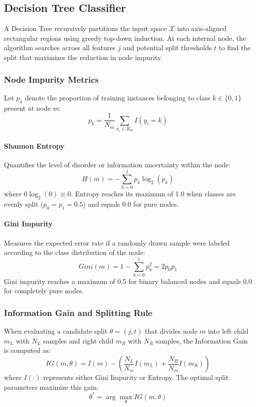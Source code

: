 \documentclass[12pt,a4paper]{article}
\begin{document}
\subsection{Decision Tree Classifier}

A Decision Tree recursively partitions the input space $\mathcal{X}$ into axis-aligned rectangular regions using greedy top-down induction. At each internal node, the algorithm searches across all features $j$ and potential split thresholds $t$ to find the split that maximizes the reduction in node impurity.

\subsubsection*{Node Impurity Metrics}

Let $p_k$ denote the proportion of training instances belonging to class $k \in \{0, 1\}$ present at node $m$:
\begin{equation}
p_k = \frac{1}{N_m} \sum_{x_i \in R_m} I(y_i = k)
\end{equation}

\paragraph{Shannon Entropy}
Quantifies the level of disorder or information uncertainty within the node:
\begin{equation}
H(m) = - \sum_{k=0}^{1} p_k \log_2 (p_k)
\end{equation}
where $0 \log_2(0) \equiv 0$. Entropy reaches its maximum of 1.0 when classes are evenly split ($p_0 = p_1 = 0.5$) and equals 0.0 for pure nodes.

\paragraph{Gini Impurity}
Measures the expected error rate if a randomly drawn sample were labeled according to the class distribution of the node:
\begin{equation}
Gini(m) = 1 - \sum_{k=0}^{1} p_k^2 = 2 p_0 p_1
\end{equation}
Gini impurity reaches a maximum of 0.5 for binary balanced nodes and equals 0.0 for completely pure nodes.

\subsubsection*{Information Gain and Splitting Rule}
When evaluating a candidate split $\theta = (j, t)$ that divides node $m$ into left child $m_L$ with $N_L$ samples and right child $m_R$ with $N_R$ samples, the Information Gain is computed as:
\begin{equation}
IG(m, \theta) = I(m) - \left( \frac{N_L}{N_m} I(m_L) + \frac{N_R}{N_m} I(m_R) \right)
\end{equation}
where $I(\cdot)$ represents either Gini Impurity or Entropy. The optimal split parameters maximize this gain:
\begin{equation}
\theta^* = \arg\max_{\theta} IG(m, \theta)
\end{equation}
\end{document}
